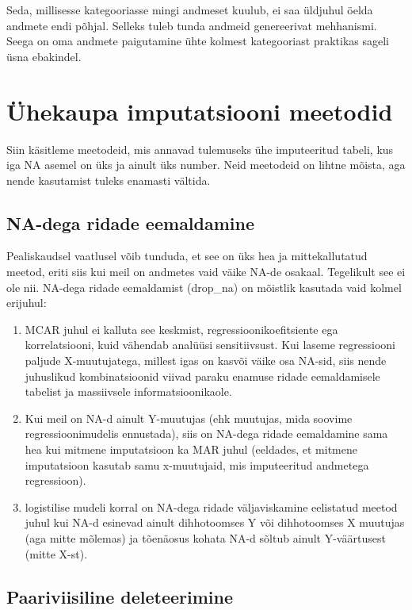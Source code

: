 \documentclass[]{book}
\begin{document}
Seda, millisesse kategooriasse mingi andmeset kuulub, ei saa üldjuhul
öelda andmete endi põhjal. Selleks tuleb tunda andmeid genereerivat
mehhanismi. Seega on oma andmete paigutamine ühte kolmest kategooriast
praktikas sageli üsna ebakindel.

\section{Ühekaupa imputatsiooni
meetodid}\label{uhekaupa-imputatsiooni-meetodid}

Siin käsitleme meetodeid, mis annavad tulemuseks ühe imputeeritud
tabeli, kus iga NA asemel on üks ja ainult üks number. Neid meetodeid on
lihtne mõista, aga nende kasutamist tuleks enamasti vältida.

\subsection{NA-dega ridade
eemaldamine}\label{na-dega-ridade-eemaldamine}

Pealiskaudsel vaatlusel võib tunduda, et see on üks hea ja
mittekallutatud meetod, eriti siis kui meil on andmetes vaid väike NA-de
osakaal. Tegelikult see ei ole nii. NA-dega ridade eemaldamist
(drop\_na) on mõistlik kasutada vaid kolmel erijuhul:

\begin{enumerate}
\def\labelenumi{\arabic{enumi}.}
\item
  MCAR juhul ei kalluta see keskmist, regressioonikoefitsiente ega
  korrelatsiooni, kuid vähendab analüüsi sensitiivsust. Kui laseme
  regressiooni paljude X-muutujatega, millest igas on kasvõi väike osa
  NA-sid, siis nende juhuslikud kombinatsioonid viivad paraku enamuse
  ridade eemaldamisele tabelist ja massiivsele informatsioonikaole.
\item
  Kui meil on NA-d ainult Y-muutujas (ehk muutujas, mida soovime
  regressioonimudelis ennustada), siis on NA-dega ridade eemaldamine
  sama hea kui mitmene imputatsioon ka MAR juhul (eeldades, et mitmene
  imputatsioon kasutab samu x-muutujaid, mis imputeeritud andmetega
  regressioon).
\item
  logistilise mudeli korral on NA-dega ridade väljaviskamine eelistatud
  meetod juhul kui NA-d esinevad ainult dihhotoomses Y või dihhotoomses
  X muutujas (aga mitte mõlemas) ja tõenäosus kohata NA-d sõltub ainult
  Y-väärtusest (mitte X-st).
\end{enumerate}

\subsection{Paariviisiline
deleteerimine}\label{paariviisiline-deleteerimine}
\end{document}
